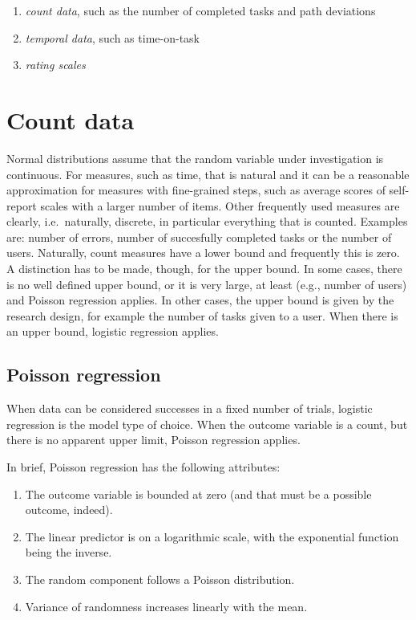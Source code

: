 \documentclass[]{svmono}
\providecommand{\tightlist}{%
  \setlength{\itemsep}{0pt}\setlength{\parskip}{0pt}}
\theoremstyle{definition}
\theoremstyle{definition}
\theoremstyle{definition}
\theoremstyle{remark}
\begin{document}
\begin{enumerate}
\def\labelenumi{\arabic{enumi}.}
\tightlist
\item
  \emph{count data}, such as the number of completed tasks and path
  deviations
\item
  \emph{temporal data}, such as time-on-task
\item
  \emph{rating scales}
\end{enumerate}

\section{Count data}\label{count_data}

Normal distributions assume that the random variable under investigation
is continuous. For measures, such as time, that is natural and it can be
a reasonable approximation for measures with fine-grained steps, such as
average scores of self-report scales with a larger number of items.
Other frequently used measures are clearly, i.e.~naturally, discrete, in
particular everything that is counted. Examples are: number of errors,
number of succesfully completed tasks or the number of users. Naturally,
count measures have a lower bound and frequently this is zero. A
distinction has to be made, though, for the upper bound. In some cases,
there is no well defined upper bound, or it is very large, at least
(e.g., number of users) and Poisson regression applies. In other cases,
the upper bound is given by the research design, for example the number
of tasks given to a user. When there is an upper bound, logistic
regression applies.

\subsection{Poisson regression}\label{poisson-regression}

When data can be considered successes in a fixed number of trials,
logistic regression is the model type of choice. When the outcome
variable is a count, but there is no apparent upper limit, Poisson
regression applies.

In brief, Poisson regression has the following attributes:

\begin{enumerate}
\def\labelenumi{\arabic{enumi}.}
\tightlist
\item
  The outcome variable is bounded at zero (and that must be a possible
  outcome, indeed).
\item
  The linear predictor is on a logarithmic scale, with the exponential
  function being the inverse.
\item
  The random component follows a Poisson distribution.
\item
  Variance of randomness increases linearly with the mean.
\end{enumerate}
\end{document}
